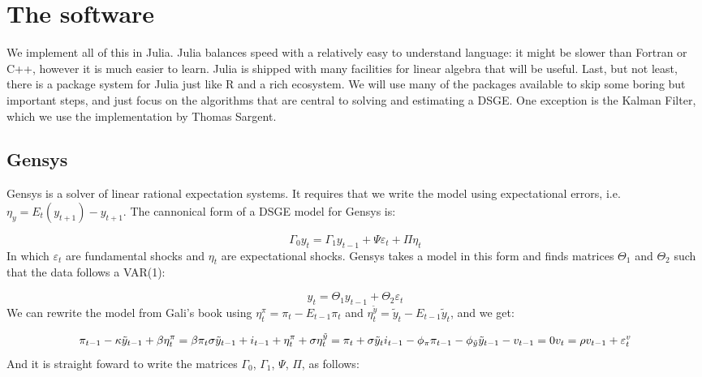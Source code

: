 \documentclass[12pt,a4paper]{article}
\begin{document}
\section{The software}
We implement all of this in Julia. Julia balances speed with a relatively easy to understand language: it might be slower than Fortran or C++, however it is much easier to learn. Julia is shipped with many facilities for linear algebra that will be useful. Last, but not least, there is a package system for Julia just like R and a rich ecosystem. We will use many of the packages available to skip some boring but important steps, and just focus on the algorithms that are central to solving and estimating a DSGE. One exception is the Kalman Filter, which we use the implementation by Thomas Sargent.

\subsection{Gensys}
Gensys is a solver of linear rational expectation systems. It requires that we write the model using expectational errors, i.e. $\eta_y = E_{t}(y_{t+1}) - y_{t+1}$. The cannonical form of a DSGE model for Gensys is:

\[
\Gamma_0 y_t = \Gamma_1 y_{t-1} + \Psi \varepsilon_t + \Pi \eta_t
\]
In which $\varepsilon_t$ are fundamental shocks and $\eta_t$ are expectational shocks. Gensys takes a model in this form and finds matrices $\Theta_1$ and $\Theta_2$ such that the data follows a VAR(1):

\[
y_t = \Theta_1 y_{t-1} + \Theta_2 \varepsilon_t
\]
We can rewrite the model from Gali's book using $\eta_t^{\pi} = \pi_t - E_{t-1} \pi_t$ and $\eta_t^{\tilde{y}} = \tilde{y}_t - E_{t-1} \tilde{y}_t$, and we get:

\[
\pi_{t-1} - \kappa \tilde{y}_{t-1} + \beta \eta_t^{\pi} = \beta \pi_t\\
\sigma\tilde{y}_{t-1} + i_{t-1} + \eta_t^{\pi} + \sigma \eta_t^{\tilde{y}} = \pi_t + \sigma \tilde{y}_t\\
i_{t-1} - \phi_{\pi}\pi_{t-1} - \phi_{\tilde{y}} \tilde{y}_{t-1} - v_{t-1} = 0\\
v_t = \rho v_{t-1} + \varepsilon^v_t
\]
And it is straight foward to write the matrices $\Gamma_0$, $\Gamma_1$, $\Psi$, $\Pi$, as follows:
\end{document}
